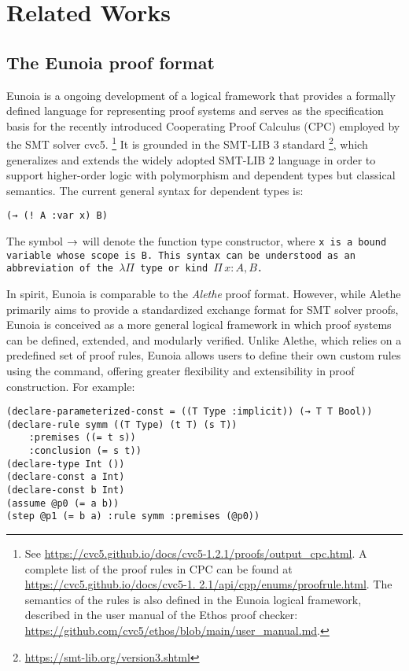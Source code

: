 \chapter{Related Works}\label{ch:relatedworks}

\section{The Eunoia proof format}
Eunoia is a ongoing development of a logical framework that provides a formally defined language for representing proof systems and serves as the specification basis for the recently introduced Cooperating Proof Calculus (CPC) employed by the SMT solver cvc5.
%
\footnote{See \url{https://cvc5.github.io/docs/cvc5-1.2.1/proofs/output_cpc.html}. A complete
list of the proof rules in CPC can be found at \url{https://cvc5.github.io/docs/cvc5-1.
2.1/api/cpp/enums/proofrule.html}. The semantics of the rules is also defined in the
Eunoia logical framework, described in the user manual of the Ethos proof checker:
\url{https://github.com/cvc5/ethos/blob/main/user_manual.md}.}
%
It is grounded in the SMT-LIB $3$  standard \footnote{\url{https://smt-lib.org/version3.shtml}}, which generalizes and extends the widely adopted SMT-LIB $2$ language in order to support higher-order logic with polymorphism and dependent types but classical semantics.
The current general syntax for dependent types is:
\begin{lstlisting}[language=Eunoia,numbers=none]
(→ (! A :var x) B) 
\end{lstlisting}
The symbol $\rightarrow$ will denote the function type constructor, where \tt{x} is a bound variable whose scope is \tt{B}. This syntax can be understood as an abbreviation of the $\lambda\Pi$ type or kind $\Pi\,x:A, B$.

In spirit, Eunoia is comparable to the \emph{Alethe} proof format.
However, while Alethe primarily aims to provide a standardized exchange format for SMT solver proofs, Eunoia is conceived as a more general logical framework in which proof systems can be defined, extended, and modularly verified.
Unlike Alethe, which relies on a predefined set of proof rules, Eunoia allows users to define their own custom rules using the  command, offering greater flexibility and extensibility in proof construction.
For example:

\begin{lstlisting}[label={lst:eunoia},caption={An Eunoia proof example},language=Eunoia]
(declare-parameterized-const = ((T Type :implicit)) (→ T T Bool))
(declare-rule symm ((T Type) (t T) (s T))
    :premises ((= t s))
    :conclusion (= s t))
(declare-type Int ())
(declare-const a Int)
(declare-const b Int)
(assume @p0 (= a b))
(step @p1 (= b a) :rule symm :premises (@p0))
\end{lstlisting}

